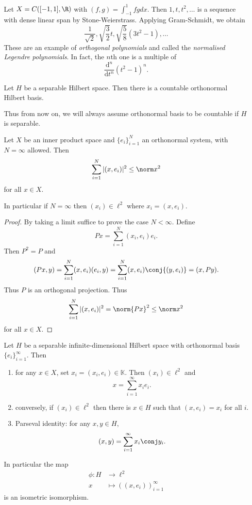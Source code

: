 \documentclass[a4paper]{article}
\newcommand{\K}{{\mathbb{K}}} %
\begin{document}
\begin{eg}
  Let \(X = C([-1, 1], \R)\) with \((f, g) = \int_{-1}^1 fg dx\). Then \(1, t, t^2, \dots\) is a sequence with dense linear span by Stone-Weierstrass. Applying Gram-Schmidt, we obtain
  \[
    \frac{1}{\sqrt{2}}, \sqrt{\frac{3}{2}}t, \sqrt{\frac{5}{8}} (3t^2 - 1), \dots
  \]
  These are an example of \emph{orthogonal polynomials} and called the \emph{normalised Legendre polynomials}. In fact, the \(n\)th one is a multiple of
  \[
    \frac{\mathrm d^n}{\mathrm dt^n}(t^2 - 1)^n.
  \]
\end{eg}

\begin{corollary}
  Let \(H\) be a separable Hilbert space. Then there is a countable orthonormal Hilbert basis.
\end{corollary}

Thus from now on, we will always assume orthonormal basis to be countable if \(H\) is separable.

\begin{proposition}
  Let \(X\) be an inner product space and \(\{e_i\}_{i = 1}^N\) an orthonormal system, with \(N = \infty\) allowed. Then
  \[
    \sum_{i = 1}^N |(x, e_i)|^2 \leq \norm x^2
  \]
  for all \(x \in X\).

  In particular if \(N = \infty\) then \((x_i) \in \ell^2\) where \(x_i = (x, e_i)\).
\end{proposition}

\begin{proof}
  By taking a limit suffice to prove the case \(N < \infty\). Define
  \[
    Px = \sum_{i = 1}^N (x_i, e_i)e_i.
  \]
  Then \(P^2 = P\) and
  \[
    (Px, y) = \sum_{i = 1}^N (x, e_i) (e_i, y) = \sum_{i = 1}^N (x, e_i) \conj{(y, e_i)} = (x, Py).
  \]
  Thus \(P\) is an orthogonal projection. Thus
  \[
    \sum_{i = 1}^N |(x, e_i)|^2 = \norm{Px}^2 \leq \norm x^2
  \]
  for all \(x \in X\).
\end{proof}

\begin{proposition}
  Let \(H\) be a separable infinite-dimensional Hilbert space with orthonormal basis \(\{e_i\}_{i = 1}^\infty\). Then
  \begin{enumerate}
  \item for any \(x \in X\), set \(x_i = (x_i, e_i) \in \K\). Then \((x_i) \in \ell^2\) and
    \[
      x = \sum_{i = 1}^\infty x_ie_i.
    \]
  \item conversely, if \((x_i) \in \ell^2\) then there is \(x \in H\) such that \((x, e_i) = x_i\) for all \(i\).
  \item Parseval identity: for any \(x, y \in H\),
    \[
      (x, y) = \sum_{i = 1}^\infty x_i \conj y_i.
    \]
  \end{enumerate}

  In particular the map
  \begin{align*}
    \phi: H &\to \ell^2 \\
    x &\mapsto ((x, e_i))_{i = 1}^\infty
  \end{align*}
  is an isometric isomorphism.
\end{proposition}
\end{document}
